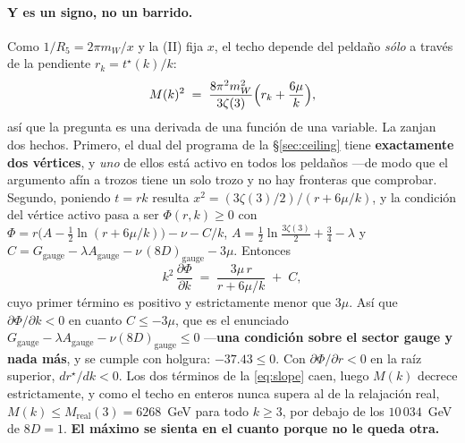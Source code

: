 \documentclass[11pt,a4paper]{article}
\begin{document}
\paragraph{Y es un signo, no un barrido.} Como $1/R_5=2\pi m_W/x$ y la (II) fija $x$, el techo
depende del peldaño \emph{sólo} a través de la pendiente $r_k=t^\star(k)/k$:
\begin{equation}\label{eq:slope}
  M(k)^2\;=\;\frac{8\pi^2m_W^2}{3\zeta(3)}\Bigl(r_k+\frac{6\mu}{k}\Bigr),
\end{equation}
así que la pregunta es una derivada de una función de una variable. La zanjan dos hechos. Primero,
el dual del programa de la \S\ref{sec:ceiling} tiene \textbf{exactamente dos vértices}, y \emph{uno}
de ellos está activo en todos los peldaños ---de modo que el argumento afín a trozos tiene un solo
trozo y no hay fronteras que comprobar. Segundo, poniendo $t=rk$ resulta
$x^2=(3\zeta(3)/2)/(r+6\mu/k)$, y la condición del vértice activo pasa a ser $\Phi(r,k)\ge0$ con
$\Phi=r\bigl(A-\tfrac12\ln(r+6\mu/k)\bigr)-\nu-C/k$,
$A=\tfrac12\ln\tfrac{3\zeta(3)}2+\tfrac34-\lambda$ y
$C=G_{\text{gauge}}-\lambda A_{\text{gauge}}-\nu\,(8D)_{\text{gauge}}-3\mu$. Entonces
\begin{equation}\label{eq:dphidk}
  k^2\,\frac{\partial\Phi}{\partial k}\;=\;\frac{3\mu\,r}{r+6\mu/k}\;+\;C ,
\end{equation}
cuyo primer término es positivo y estrictamente menor que $3\mu$. Así que
$\partial\Phi/\partial k<0$ en cuanto $C\le-3\mu$, que es el enunciado
$G_{\text{gauge}}-\lambda A_{\text{gauge}}-\nu(8D)_{\text{gauge}}\le0$ ---\textbf{una condición
sobre el sector gauge y nada más}, y se cumple con holgura: $-37.43\le0$. Con
$\partial\Phi/\partial r<0$ en la raíz superior, $dr^\star/dk<0$. Los dos términos de la
\eqref{eq:slope} caen, luego $M(k)$ decrece estrictamente, y como el techo en enteros nunca supera al
de la relajación real, $M(k)\le M_{\text{real}}(3)=6268$~GeV para todo $k\ge3$, por debajo de los
$10\,034$~GeV de $8D=1$. \textbf{El máximo se sienta en el cuanto porque no le queda otra.}
\end{document}
